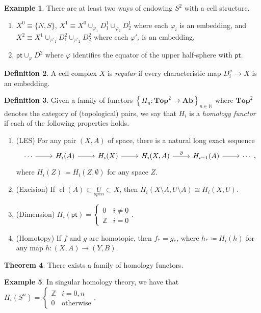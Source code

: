 \documentclass[10pt,letterpaper,cm]{nupset}
\theoremstyle{definition}
\newtheorem{defn}{Definition}[subsection]
\newtheorem{exmp}[defn]{Example}
\theoremstyle{theorem}
\newtheorem{theorem}[defn]{Theorem}
\theoremstyle{remark}
\newcommand{\N}{\mathbb N}
\newcommand{\Z}{\mathbb Z}
\newcommand{\1}{\mathbb{1}}
\newcommand{\0}{\vec 0}
\newcommand{\pt}{\mathsf{pt}}
\DeclareMathOperator{\cl}{cl}
\newcommand{\be}{\begin{enumerate}}
\newcommand{\ee}{\end{enumerate}}
\begin{document}
\begin{exmp} There are at least two ways of endowing $S^2$ with a cell structure.
\be
\item $X^0 \equiv \{N, S\}$, $X^1 \equiv X^0 \cup_{\varphi_1} D_1^1 \cup_{\varphi_2} D_2^1$ where each $\varphi_i$ is an embedding, and $X^2 \equiv X^1  \cup_{\varphi'_1} D_1^2 \cup_{\varphi'_2} D_2^2$ where each $\varphi'_i$ is an embedding. 
\item $\pt \cup_{\varphi} D^2$ where $\varphi$ identifies the equator of the upper half-sphere with $\pt$.
\ee
\end{exmp}

\begin{defn}
A cell complex $X$ is \textit{regular} if every characteristic map $D_i^n \to X$ is an embedding. 
\end{defn}

\begin{defn}
Given a family of functors $\left\{H_n : \mathbf{Top}^2 \to \mathbf{Ab}\right\}_{n\in \N}$ where $\mathbf{Top}^2$ denotes the category of (topological) pairs, we say that $H_i$ is a \textit{homology functor} if  each of the following properties holds.
\be
\item (LES) For any pair $(X, A)$ of space, there is a natural long exact sequence
\[
\begin{tikzcd}
\cdots \arrow[r] & H_i(A)  \arrow[r] & H_i(X) \arrow[r] & {H_i(X, A)} \arrow[r, "\partial"] & H_{i-1}(A) \arrow[r] & \cdots
\end{tikzcd},
\] where $H_i(Z) \coloneqq H_i(Z, \emptyset)$ for any space $Z$.
\item (Excision) If $\cl(A) \subset \underset{open}{U} \subset X$, then $H_i(X\setminus A, U \setminus A) \cong H_i(X, U)$.
\item (Dimension) $H_i(\pt) = \begin{cases} 0 & i \ne 0 \\ \Z & i =0 \end{cases}$.
\item (Homotopy) If $f$ and $g$ are homotopic, then $f_{\ast} = g_{\ast}$, where $h_{\ast} \coloneqq H_i(h)$ for any map $h: (X,A) \to (Y, B)$. 
\ee
\end{defn}

\begin{theorem}
There exists a family of homology functors.
\end{theorem}

\begin{exmp}
In singular homology theory, we have that $H_i(S^n) = \begin{cases} \Z & i = 0, n \\ 0 & \text{otherwise} \end{cases}.$ 
\end{exmp}
\end{document}
